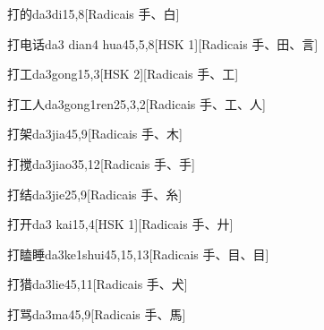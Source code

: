 \begin{entry}{打的}{da3di1}{5,8}[Radicais ⼿、⽩]
\end{entry}

\begin{entry}{打电话}{da3 dian4 hua4}{5,5,8}[HSK 1][Radicais ⼿、⽥、⾔]
\end{entry}

\begin{entry}{打工}{da3gong1}{5,3}[HSK 2][Radicais ⼿、⼯]
\end{entry}

\begin{entry}{打工人}{da3gong1ren2}{5,3,2}[Radicais ⼿、⼯、⼈]
\end{entry}

\begin{entry}{打架}{da3jia4}{5,9}[Radicais ⼿、⽊]
\end{entry}

\begin{entry}{打搅}{da3jiao3}{5,12}[Radicais ⼿、⼿]
\end{entry}

\begin{entry}{打结}{da3jie2}{5,9}[Radicais ⼿、⽷]
\end{entry}

\begin{entry}{打开}{da3 kai1}{5,4}[HSK 1][Radicais ⼿、⼶]
\end{entry}

\begin{entry}{打瞌睡}{da3ke1shui4}{5,15,13}[Radicais ⼿、⽬、⽬]
\end{entry}

\begin{entry}{打猎}{da3lie4}{5,11}[Radicais ⼿、⽝]
\end{entry}

\begin{entry}{打骂}{da3ma4}{5,9}[Radicais ⼿、⾺]
\end{entry}


